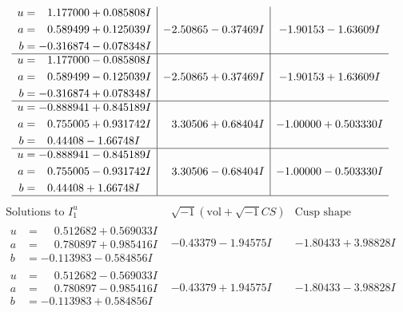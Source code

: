 \documentclass[1p]{elsarticle_modified}
\theoremstyle{definition}
\newcommand{\I}{\sqrt{-1}}
\begin{document}
$$\begin{array}{c|c|c}
\begin{aligned}
u &= \phantom{-}1.177000 + 0.085808 I \\
a &= \phantom{-}0.589499 + 0.125039 I \\
b &= -0.316874 - 0.078348 I\end{aligned}
 & -2.50865 - 0.37469 I & -1.90153 - 1.63609 I \\ \hline\begin{aligned}
u &= \phantom{-}1.177000 - 0.085808 I \\
a &= \phantom{-}0.589499 - 0.125039 I \\
b &= -0.316874 + 0.078348 I\end{aligned}
 & -2.50865 + 0.37469 I & -1.90153 + 1.63609 I \\ \hline\begin{aligned}
u &= -0.888941 + 0.845189 I \\
a &= \phantom{-}0.755005 + 0.931742 I \\
b &= \phantom{-}0.44408 - 1.66748 I\end{aligned}
 & \phantom{-}3.30506 + 0.68404 I & -1.00000 + 0.503330 I \\ \hline\begin{aligned}
u &= -0.888941 - 0.845189 I \\
a &= \phantom{-}0.755005 - 0.931742 I \\
b &= \phantom{-}0.44408 + 1.66748 I\end{aligned}
 & \phantom{-}3.30506 - 0.68404 I & -1.00000 - 0.503330 I\\
 \hline 
 \end{array}$$\newpage$$\begin{array}{c|c|c}  
\text{Solutions to }I^u_{1}& \I (\text{vol} + \sqrt{-1}CS) & \text{Cusp shape}\\
 \hline 
\begin{aligned}
u &= \phantom{-}0.512682 + 0.569033 I \\
a &= \phantom{-}0.780897 + 0.985416 I \\
b &= -0.113983 - 0.584856 I\end{aligned}
 & -0.43379 - 1.94575 I & -1.80433 + 3.98828 I \\ \hline\begin{aligned}
u &= \phantom{-}0.512682 - 0.569033 I \\
a &= \phantom{-}0.780897 - 0.985416 I \\
b &= -0.113983 + 0.584856 I\end{aligned}
 & -0.43379 + 1.94575 I & -1.80433 - 3.98828 I \\ \hline\begin{aligned}

\end{aligned}
\end{array}$$
\end{document}
